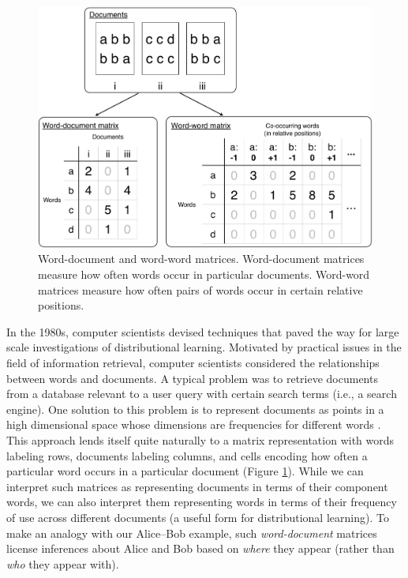 \documentclass[man,floatsintext]{apa6}
\begin{document}
\begin{figure}[t]
  \begin{center}
    \includegraphics[width=0.9\linewidth]{matrices}
  \end{center}
  \caption{Word-document and word-word matrices. Word-document matrices measure how often words occur in particular documents. Word-word matrices measure how often pairs of words occur in certain relative positions.}
  \label{matrices}
\end{figure}

In the 1980s, computer scientists devised techniques that paved the way for large scale investigations of distributional learning. Motivated by practical issues in the field of information retrieval, computer scientists considered the relationships between words and documents. A typical problem was to retrieve documents from a database relevant to a user query with certain search terms (i.e., a search engine). One solution to this problem is to represent documents as points in a high dimensional space whose dimensions are frequencies for different words \citep{salton1983}. This approach lends itself quite naturally to a matrix representation with words labeling rows, documents labeling columns, and cells encoding how often a particular word occurs in a particular document (Figure \ref{matrices}). While we can interpret such matrices as representing documents in terms of their component words, we can also interpret them representing words in terms of their frequency of use across different documents (a useful form for distributional learning). To make an analogy with our Alice--Bob example, such \emph{word-document} matrices license inferences about Alice and Bob based on \emph{where} they appear (rather than \emph{who} they appear with).
\end{document}
